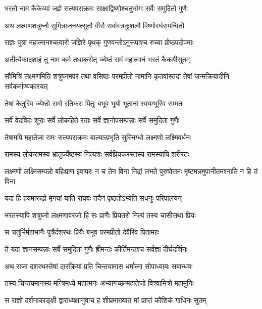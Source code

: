 \twolineshloka
{भरतो नाम कैकेय्यां जज्ञे सत्यपराक्रमः}
{साक्षाद्विष्णोश्चतुर्भागः सर्वैः समुदितो गुणैः} %

\twolineshloka
{अथ लक्ष्मणशत्रुघ्नौ सुमित्राजनयत्सुतौ}
{वीरौ सर्वास्त्रकुशलौ विष्णोरर्धसमन्वितौ} %

\twolineshloka
{राज्ञः पुत्रा महात्मानश्चत्वारो जज्ञिरे पृथक्}
{गुणवन्तोऽनुरूपाश्च रुच्या प्रोष्ठपदोपमाः} %

\twolineshloka
{अतीत्यैकादशाहं तु नाम कर्म तथाकरोत्}
{ज्येष्ठं रामं महात्मानं भरतं कैकयीसुतम्} %

\threelineshloka
{सौमित्रिं लक्ष्मणमिति शत्रुघ्नमपरं तथा}
{वसिष्ठः परमप्रीतो नामानि कृतवांस्तदा}
{तेषां जन्मक्रियादीनि सर्वकर्माण्यकारयत्} %

\twolineshloka
{तेषां केतुरिव ज्येष्ठो रामो रतिकरः पितुः}
{बभूव भूयो भूतानां स्वयम्भूरिव सम्मतः} %

\twolineshloka
{सर्वे वेदविदः शूराः सर्वे लोकहिते रताः}
{सर्वे ज्ञानोपसम्पन्नाः सर्वे समुदिता गुणैः} %

\twolineshloka
{तेषामपि महातेजा रामः सत्यपराक्रमः}
{बाल्यात्प्रभृति सुस्निग्धो लक्ष्मणो लक्ष्मिवर्धनः} %

\twolineshloka
{रामस्य लोकरामस्य भ्रातुर्ज्येष्ठस्य नित्यशः}
{सर्वप्रियकरस्तस्य रामस्यापि शरीरतः} %

\threelineshloka
{लक्ष्मणो लक्ष्मिसम्पन्नो बहिःप्राण इवापरः}
{न च तेन विना निद्रां लभते पुरुषोत्तमः}
{मृष्टमन्नमुपानीतमश्नाति न हि तं विना} %

\twolineshloka
{यदा हि हयमारूढो मृगयां याति राघवः}
{तदैनं पृष्ठतोऽभ्येति सधनुः परिपालयन्} %

\twolineshloka
{भरतस्यापि शत्रुघ्नो लक्ष्मणावरजो हि सः}
{प्राणैः प्रियतरो नित्यं तस्य चासीत्तथा प्रियः} %

\twolineshloka
{स चतुर्भिर्महाभागैः पुत्रैर्दशरथः प्रियैः}
{बभूव परमप्रीतो देवैरिव पितामहः} %

\twolineshloka
{ते यदा ज्ञानसम्पन्नाः सर्वे समुदिता गुणैः}
{ह्रीमन्तः कीर्तिमन्तश्च सर्वज्ञा दीर्घदर्शिनः} %

\twolineshloka
{अथ राजा दशरथस्तेषां दारक्रियां प्रति}
{चिन्तयामास धर्मात्मा सोपाध्यायः सबान्धवः} %

\twolineshloka
{तस्य चिन्तयमानस्य मन्त्रिमध्ये महात्मनः}
{अभ्यागच्छन्महातेजो विश्वामित्रो महामुनिः} %

\twolineshloka
{स राज्ञो दर्शनाकाङ्क्षी द्वाराध्यक्षानुवाच ह}
{शीघ्रमाख्यात मां प्राप्तं कौशिकं गाधिनः सुतम्} %

